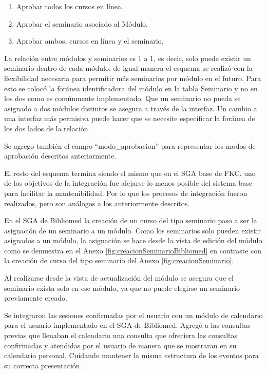 	\begin{enumerate}
		\item Aprobar todos los cursos en línea.
		\item Aprobar el seminario asociado al Módulo.
		\item Aprobar ambos, cursos en línea y el seminario.
	\end{enumerate}

	La relación entre módulos y seminarios es 1 a 1, es decir, solo puede existir un seminario dentro de cada módulo, de igual manera el esquema se realizó con la flexibilidad necesaria para permitir más seminarios por módulo en el futuro. Para esto se colocó la foránea identificadora del módulo en la tabla Seminario y no en los dos como es comúnmente implementado. Que un seminario no pueda se asignado a dos módulos distintos se asegura a través de la interfaz. Un cambio a una interfaz más permisiva puede hacer que se necesite especificar la foránea de los dos lados de la relación. 

	Se agrego también el campo ``modo\_aprobacion'' para representar los modos de aprobación descritos anteriormente.

	El resto del esquema termina siendo el mismo que en el SGA base de FKC. uno de los objetivos de la integración fue alejarse lo menos posible del sistema base para facilitar la mantenibilidad. Por lo que los procesos de integración fueron realizados, pero son análogos a los anteriormente descritos.

	En el SGA de Bibliomed la creación de un curso del tipo seminario paso a ser la asignación de un seminario a un módulo. Como los seminarios solo pueden existir asignados a un módulo, la asignación se hace desde la vista de edición del módulo como se demuestra en el Anexo \ref{fig:creacionSeminarioBibliomed} en contraste con la creación de curso del tipo seminario del Anexo \ref{fig:creacionSeminario}.

	Al realizarse desde la vista de actualización del módulo se asegura que el seminario exista solo en ese módulo, ya que no puede elegirse un seminario previamente creado.

	Se integraron las sesiones confirmadas por el usuario con un módulo de calendario para el usuario implementado en el SGA de Bibliomed. Agregó a las consultas previas que llenaban el calendario una consulta que ofreciera las consultas confirmadas y atendidas por el usuario de manera que se mostraran en su calendario personal. Cuidando mantener la misma estructura de los eventos para su correcta presentación.



